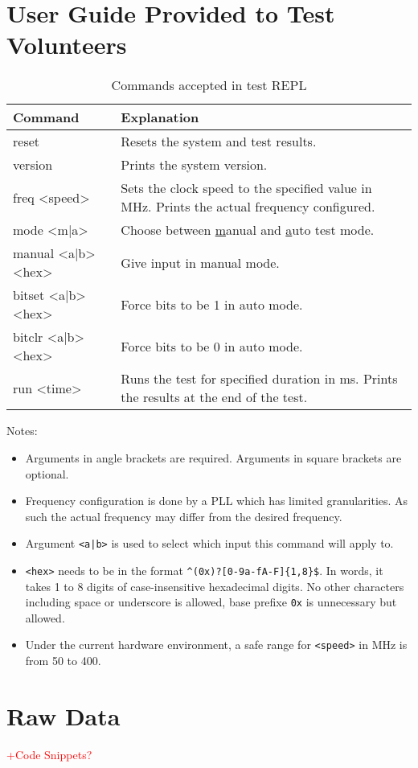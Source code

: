 \chapter{User Guide Provided to Test Volunteers}

\begin{table}[H]
  \centering
  \begin{tabular}{|>{\ttfamily}p{11em}|p{\dimexpr\textwidth-18em}|}
    \hline
    \textrm{Command}   & Explanation \\
    \hline
    reset              & Resets the system and test results. \\
    version            & Prints the system version. \\
    freq <speed>       & Sets the clock speed to the specified value in MHz. Prints the actual frequency configured. \\
    mode <m|a>         & Choose between \underline{m}anual and \underline{a}uto test mode. \\
    manual <a|b> <hex>  & Give input in manual mode. \\
    bitset <a|b> <hex>  & Force bits to be 1 in auto mode. \\
    bitclr <a|b> <hex>  & Force bits to be 0 in auto mode. \\
    run <time>         & Runs the test for specified duration in ms. Prints the results at the end of the test. \\
    \hline
  \end{tabular}
  \caption{Commands accepted in test REPL}
\end{table}

Notes:
\begin{itemize}
  \item Arguments in angle brackets are required. Arguments in square brackets are optional.
  \item Frequency configuration is done by a PLL which has limited granularities. As such the actual frequency may differ from the desired frequency.
  \item Argument \texttt{<a|b>} is used to select which input this command will apply to.
  \item \texttt{<hex>} needs to be in the format \texttt{\textasciicircum(0x)?[0-9a-fA-F]\{1,8\}\$}. In words, it takes 1 to 8 digits of case-insensitive hexadecimal digits. No other characters including space or underscore is allowed, base prefixe \texttt{0x} is unnecessary but allowed.
  \item Under the current hardware environment, a safe range for \texttt{<speed>} in MHz is from 50 to 400.
\end{itemize}


\chapter{Raw Data}

\textcolor{red}{+Code Snippets?}

